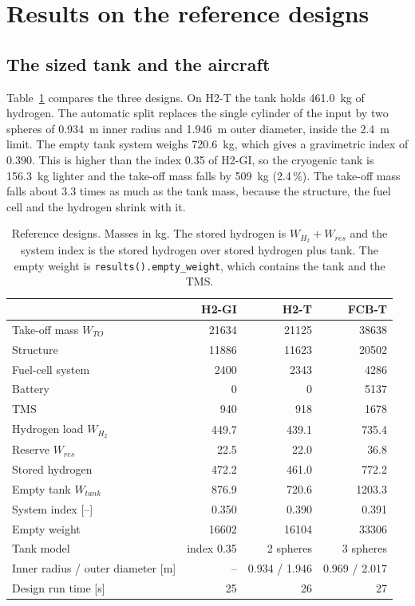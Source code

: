 \documentclass[a4paper,11pt]{article}
\begin{document}
\section{Results on the reference designs}\label{sec:results}

\subsection{The sized tank and the aircraft}\label{sec:resref}
Table~\ref{tab:designs} compares the three designs. On H2-T the tank holds \SI{461.0}{kg}
of hydrogen. The automatic split replaces the single cylinder of the input by two spheres of
\SI{0.934}{m} inner radius and \SI{1.946}{m} outer diameter, inside the \SI{2.4}{m} limit.
The empty tank system weighs \SI{720.6}{kg}, which gives a gravimetric index of 0.390.
This is higher than the index 0.35 of H2-GI, so the cryogenic tank is \SI{156.3}{kg} lighter and the
take-off mass falls by \SI{509}{kg} (2.4\,\%). The take-off mass falls about 3.3 times as much as the
tank mass, because the structure, the fuel cell and the hydrogen shrink with it.

\begin{table}[htbp]
\centering\small
\caption{Reference designs. Masses in kg. The stored hydrogen is $W_{H_2} + W_{res}$ and the
system index is the stored hydrogen over stored hydrogen plus tank. The empty weight is
\texttt{results().empty\_weight}, which contains the tank and the TMS.}\label{tab:designs}
\begin{tabular}{@{}lrrr@{}}
\toprule
 & H2-GI & H2-T & FCB-T \\
\midrule
Take-off mass $W_{TO}$ & 21634 & 21125 & 38638 \\
Structure & 11886 & 11623 & 20502 \\
Fuel-cell system & 2400 & 2343 & 4286 \\
Battery & 0 & 0 & 5137 \\
TMS & 940 & 918 & 1678 \\
Hydrogen load $W_{H_2}$ & 449.7 & 439.1 & 735.4 \\
Reserve $W_{res}$ & 22.5 & 22.0 & 36.8 \\
Stored hydrogen & 472.2 & 461.0 & 772.2 \\
Empty tank $W_{tank}$ & 876.9 & 720.6 & 1203.3 \\
System index [--] & 0.350 & 0.390 & 0.391 \\
Empty weight & 16602 & 16104 & 33306 \\
\midrule
Tank model & index 0.35 & 2 spheres & 3 spheres \\
Inner radius / outer diameter [m] & -- & 0.934 / 1.946 & 0.969 / 2.017 \\
Design run time [s] & 25 & 26 & 27 \\
\bottomrule
\end{tabular}
\end{table}
\end{document}

